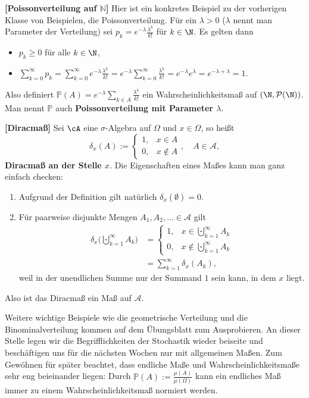 \begin{beispiel}\label{Poi1}  \textbf{[Poissonverteilung auf $\mathbb N$]}
	Hier ist ein konkretes Beispiel zu der vorherigen Klasse von Beispielen, die Poissonverteilung. F\"ur ein $\lambda >0$ ($\lambda$ nennt man Parameter der Verteilung) sei
	$p_k = e^{-\lambda} \frac{\lambda^k}{k!}$ f\"ur $k\in\N$. Es gelten dann
	\begin{itemize}
		\item $p_k \geq 0$ f\"ur alle $k\in\N$,
		\item $\sum\limits_{k=0}^{\infty} p_k = \sum\limits_{k=0}^{\infty} e^{-\lambda} \frac{\lambda^k}{k!} = e^{-\lambda} \sum\limits_{k=0}^{\infty} \frac{\lambda^k}{k!} = e^{-\lambda} e^{\lambda} = e^{-\lambda + \lambda} = 1$.
	\end{itemize}
	Also definiert $\mathbb P(A)=e^{-\lambda} \sum_{k\in A} \frac{\lambda^k}{k!}$ ein Wahrscheinlichkeitsma\ss{} auf $(\N, \mathcal P(\N))$. Man nennt $\mathbb P$ auch \textbf{Poissonverteilung mit Parameter $\lambda$}.
\end{beispiel}
\begin{beispiel}  \textbf{[Diracmaß]}
	Sei $\cA$ eine $\sigma$-Algebra auf $\Omega$ und $x \in \Omega$, so heißt $$\delta_x(A):=\begin{cases}
	1,&x \in A\\
	0,&x \notin A
	\end{cases},\quad A\in \mathcal A,$$ \textbf{Diracmaß an der Stelle $x$}. Die Eigenschaften eines Ma\ss es kann man ganz einfach checken:
	\begin{enumerate}[label=(\roman*)]
		\item Aufgrund der Definition gilt nat\"urlich $\delta_x(\emptyset) = 0$.
		\item F\"ur paarweise disjunkte Mengen $A_1 ,A_2, ... \in \mathcal A$ gilt 
		\begin{align*}
		\delta_x\Big(\bigcupdot\limits_{k=1}^{\infty} A_k\Big) &= \begin{cases}
		1,&x \in \bigcupdot\limits_{k=1}^{\infty} A_k\\
		0,&x \notin \bigcupdot\limits_{k=1}^{\infty} A_k
		\end{cases}\\& = \sum\limits_{k=1}^{\infty} \delta_x(A_k),
		\end{align*}
		 weil in der unendlichen Summe nur der Summand $1$ sein kann, in dem $x$ liegt.
	\end{enumerate}
	Also ist das Diracma\ss{} ein Ma\ss{} auf $\mathcal A$.
\end{beispiel}
Weitere wichtige Beispiele wie die geometrische Verteilung und die Binominalverteilung kommen auf dem \"Ubungsblatt zum Ausprobieren. An dieser Stelle legen wir die Begrifflichkeiten der Stochastik wieder beiseite und besch\"aftigen uns f\"ur die n\"achsten Wochen nur mit allgemeinen Ma\ss en. Zum Gew\"ohnen f\"ur sp\"ater beachtet, dass endliche Ma\ss e und Wahrscheinlichkeitsma\ss e sehr eng beieinander liegen: Durch $\mathbb P(A):=\frac{\mu(A)}{\mu(\Omega)}$ kann ein endliches Ma\ss{} immer zu einem Wahrscheinlichkeitsma\ss{} \glqq normiert\grqq{} werden.\smallskip


